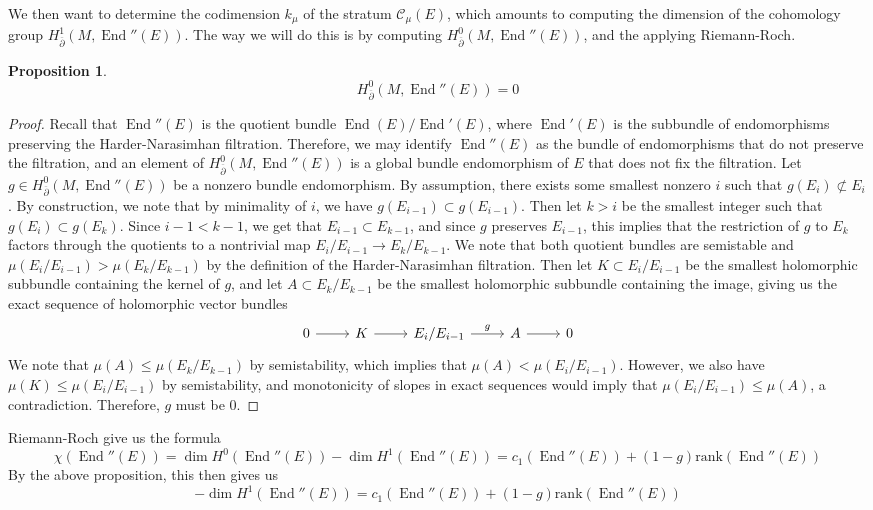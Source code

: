 \documentclass[psamsfonts, 12pt]{amsart}
\newtheorem{prop}[thm]{Proposition}
\theoremstyle{definition}
\theoremstyle{remark}
\newcommand{\dbar}{\overline{\partial}}
\DeclareMathOperator{\End}{End}
\begin{document}
We then want to determine the codimension $k_\mu$ of the stratum $\mathscr{C}_\mu(E)$,
which amounts to computing the dimension of the cohomology group
$H^1_{\dbar}(M,\End''(E))$. The way we will do this is by computing
$H^0_{\dbar}(M,\End''(E))$, and the applying Riemann-Roch.
%
\begin{prop}
\[
H^0_{\dbar}(M,\End''(E)) = 0
\]
\end{prop}
%
\begin{proof}
Recall that $\End''(E)$ is the quotient bundle $\End(E)/\End'(E)$, where $\End'(E)$
is the subbundle of endomorphisms preserving the Harder-Narasimhan filtration.
Therefore, we may identify $\End''(E)$ as the bundle of endomorphisms that do
not preserve the filtration, and an element of $H^0_{\dbar}(M,\End''(E))$ is a global
bundle endomorphism of $E$ that does not fix the filtration. Let
$g \in H^0_{\dbar}(M,\End''(E))$ be a nonzero bundle endomorphism. By assumption,
there exists some smallest nonzero $i$ such that $g(E_i) \not\subset E_i$.
By construction, we note that by minimality of $i$, we have
$g(E_{i-1}) \subset g(E_{i-1})$. Then let $k > i$ be the smallest integer such that
$g(E_i) \subset g(E_k)$. Since $i-1 < k-1$, we get that $E_{i-1} \subset E_{k-1}$,
and since $g$ preserves $E_{i-1}$, this implies that the restriction of $g$ to
$E_k$ factors through the quotients to a nontrivial map $E_i/E_{i-1} \to E_k/E_{k-1}$.
We note that both quotient bundles are semistable and
$\mu(E_i/E_{i-1}) > \mu(E_k/E_{k-1})$ by the definition of the Harder-Narasimhan
filtration. Then let $K \subset E_i/E_{i-1}$ be the smallest holomorphic subbundle
containing the kernel of $g$, and let $A \subset E_k/E_{k-1}$ be the smallest
holomorphic subbundle containing the image, giving us the exact sequence of
holomorphic vector bundles
\[\begin{tikzcd}
0 \ar[r] & K \ar[r] & E_i/E_{i-1} \ar[r, "g"] & A \ar[r] & 0
\end{tikzcd}\]
We note that $\mu(A) \leq \mu(E_k/E_{k-1})$ by semistability, which implies that
$\mu(A) < \mu(E_i/E_{i-1})$. However, we also have $\mu(K) \leq \mu(E_i/E_{i-1})$
by semistability, and monotonicity of slopes in exact sequences would imply
that $\mu(E_i/E_{i-1}) \leq \mu(A)$, a contradiction. Therefore, $g$ must be $0$.
\end{proof}
%
Riemann-Roch give us the formula
\[
\chi(\End''(E)) = \dim H^0(\End''(E)) - \dim H^1(\End''(E))
= c_1(\End''(E)) + (1-g)\mathrm{rank}(\End''(E))
\]
By the above proposition, this then gives us
\[
-\dim H^1(\End''(E)) = c_1(\End''(E)) + (1-g)\mathrm{rank}(\End''(E))
\]
\end{document}
